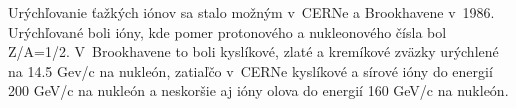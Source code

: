 Urýchľovanie ťažkých iónov sa stalo možným v~CERNe a
Brookhavene v~1986.  Urýchľované boli ióny, kde pomer
protonového a nukleonového čísla bol Z/A=1/2. V~Brookhavene to
boli kyslíkové, zlaté a kremíkové zväzky urýchlené na 14.5
Gev/c na nukleón, zatiaľčo v~CERNe kyslíkové a sírové
ióny  do energií 200 GeV/c na nukleón a neskoršie
aj ióny olova do energií 160 GeV/c na nukleón.
%
%
%
